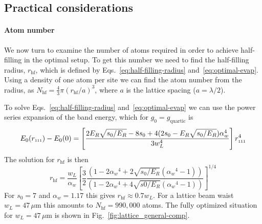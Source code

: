\documentclass[11pt,letter]{article}
\newcommand{\rdiag}{\ensuremath{ r_{\text{\tiny{111}}} } }
\newcommand{\awaist}{\ensuremath{ \alpha_{w} }}
\begin{document}
\subsection{Practical considerations} 

\paragraph{Atom number} We now turn to examine the number of atoms required in
order to achieve half-filling in the optimal setup.   To get this number we
need to find the half-filling radius, $r_{\text{hf}}$,  which is defined by
Eqs.~\ref{eq:half-filling-radius} and~\ref{eq:optimal-evap}.  Using a density
of one atom per site we can find the atom number from the radius, as
$N_{\text{hf}} = \frac{4}{3} \pi (r_{\text{hf}}/a)^{3}$,  where $a$ is the
lattice spacing ($a=\lambda/2$). 

To solve Eqs.~\ref{eq:half-filling-radius} and~\ref{eq:optimal-evap} we can use
the power series expansion of the band energy, which for
$g_{0}=g_{\text{quartic}}$ is 
\begin{equation}
  E_{0}(\rdiag) - E_{0}(0) = \left[  
  \frac{  2E_{R}\sqrt{s_{0}/E_{R}} - 8s_{0} 
   + 4( 2s_{0} -E_{R}\sqrt{s_{0}/E_{R}} ) \awaist^{4} }
  { 3 w_{L}^{4} } \right] \rdiag^{4} 
\end{equation}
The solution for $r_{\text{hf}}$ is then 
\begin{equation}
  r_{\text{hf}} =  \frac{w_{L}}{\awaist} \left[ 
  \frac{3}{2}  
  \frac{( 1 - 2\awaist^{4} + 2 \sqrt{s_{0}/E_{R}}( \awaist^{4} -1 ) )}
  { ( 1 -  2\awaist^{4} + 4 \sqrt{s0/E_{R}} ( \awaist^{4} -1 ) ) } 
  \right]^{1/4} 
\end{equation}
For $s_{0}=7$ and $\awaist=1.17$ this gives  $r_{\text{hf}}\approx 0.7 w_{L}$.
For a lattice beam waist $w_{L}=47\,\mu$m  this amounts to
$N_{\text{hf}}=990,000$ atoms.    The fully optimized situation for
$w_{L}=47\,\mu$m is shown in Fig.~\ref{fig:lattice_general-comp}. 
 

% 
\end{document}
